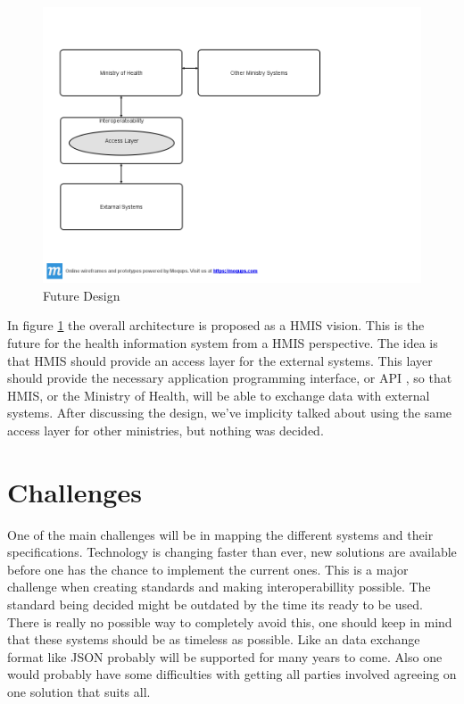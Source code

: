 \begin{figure}
\centering
\includegraphics[width=12cm]{empirical/images/future_design_rwanda}
\caption{Future Design}
\label{future_design}
\end{figure}

In figure \ref{future_design} the overall architecture is proposed as a HMIS vision. This is the future for the health information system from a HMIS perspective.
The idea is that HMIS should provide an access layer for the external systems. This layer should provide the necessary application programming interface, or API , so that HMIS, or the Ministry of Health, will be able to exchange data with external systems. After discussing the design, we've implicity talked about using the same access layer for other ministries, but nothing was decided.



\section{Challenges}
One of the main challenges will be in mapping the different systems and their specifications.
Technology is changing faster than ever, new solutions are available before one has the chance to implement the current ones.
This is a major challenge when creating standards and making interoperabillity possible.
The standard being decided might be outdated by the time its ready to be used.
There is really no possible way to completely avoid this, one should keep in mind that these systems should be as timeless as possible.
Like an data exchange format like JSON probably will be supported for many years to come. 
Also one would probably have some difficulties with getting all parties involved agreeing on one solution that suits all.
